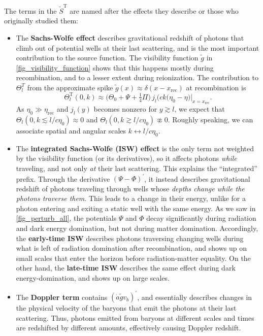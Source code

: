 \documentclass[10pt,a4paper]{article}
\begin{document}
The terms in the $\tilde{S}^\text{T}$ are named after the effects they describe or those who originally studied them:
\begin{itemize}
\item
The \textbf{Sachs-Wolfe effect} describes gravitational redshift of photons that climb out of potential wells at their last scattering,
and is the most important contribution to the source function.
The visibility function $\tilde{g}$ in \cref{fig_visibility_function} shows that this happens mostly during recombination,
and to a lesser extent during reionization.
The contribution to $\Theta_l^T$ from the approximate spike $\tilde{g}(x) \approx \delta(x-x_\text{rec})$ at recombination is
\begin{equation}
	\Theta^\text{T}_l(0,k) \approx \big(\Theta_0 + \Psi + \tfrac14 \Pi \big) \, j_l\big(ck(\eta_0-\eta\big) \Big|_{x=x_\text{rec}}.
\end{equation}
As $\eta_0 \gg \eta_\text{rec}$ and $j_l(y)$ becomes nonzero for $y \gtrsim l$,
we expect that
$\Theta_l(0,k \lesssim l / c \eta_0) \approx 0$ and
$\Theta_l(0,k \gtrsim l / c \eta_0) \not\approx 0$.
Roughly speaking,
we can associate spatial and angular scales $k \leftrightarrow l/c\eta_0$.

\item
The \textbf{integrated Sachs-Wolfe (ISW) effect} is the only term not weighted by the visibility function (or its derivatives),
so it affects photons \emph{while} traveling, and not only \emph{at} their last scattering.
This explains the ``integrated'' prefix.
Through the derivative $(\Psi-\Phi)^\prime$,
it instead describes gravitational redshift of photons traveling through wells whose \emph{depths change while the photons traverse them}.
This leads to a change in their energy, unlike for a photon entering and exiting a static well with the same energy.
As we saw in \cref{fig_perturb_all}, the potentials $\Psi$ and $\Phi$ decay significantly during radiation and dark energy domination, but not during matter domination.
Accordingly, the \textbf{early-time ISW} describes photons traversing changing wells during what is left of radiation domination after recombination, and shows up on small scales that enter the horizon before radiation-matter equality.
On the other hand, the \textbf{late-time ISW} describes the same effect during dark energy-domination,
and shows up on large scales.

\item
The \textbf{Doppler term} contains $(\dot{a} \tilde{g} v_b)^\prime$,
and essentially describes changes in the physical velocity of the baryons that emit the photons at their last scattering.
Thus, photons emitted from baryons at different scales and times are redshifted by different amounts,
effectively causing Doppler redshift.


\end{itemize}
\end{document}
